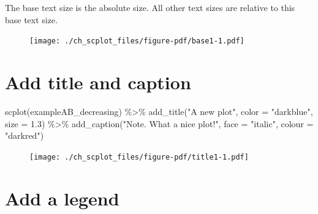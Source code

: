 \documentclass[
  letterpaper,
  DIV=11,
  numbers=noendperiod]{scrreprt}
\newenvironment{Shaded}{\begin{snugshade}}{\end{snugshade}}
\newcommand{\AttributeTok}[1]{\textcolor[rgb]{0.40,0.45,0.13}{#1}}
\newcommand{\DecValTok}[1]{\textcolor[rgb]{0.68,0.00,0.00}{#1}}
\newcommand{\FloatTok}[1]{\textcolor[rgb]{0.68,0.00,0.00}{#1}}
\newcommand{\FunctionTok}[1]{\textcolor[rgb]{0.28,0.35,0.67}{#1}}
\newcommand{\NormalTok}[1]{\textcolor[rgb]{0.00,0.23,0.31}{#1}}
\newcommand{\SpecialCharTok}[1]{\textcolor[rgb]{0.37,0.37,0.37}{#1}}
\newcommand{\StringTok}[1]{\textcolor[rgb]{0.13,0.47,0.30}{#1}}
\begin{document}
The base text size is the absolute size. All other text sizes are
relative to this base text size.

\begin{Shaded}
\end{Shaded}

\begin{figure}[H]

{\centering \texttt{[image: ./ch\_scplot\_files/figure-pdf/base1-1.pdf]}

}

\end{figure}

\hypertarget{add-title-and-caption}{%
\section{Add title and caption}\label{add-title-and-caption}}

\begin{Shaded}
\begin{Highlighting}[]
\FunctionTok{scplot}\NormalTok{(exampleAB\_decreasing) }\SpecialCharTok{\%\textgreater{}\%}
  \FunctionTok{add\_title}\NormalTok{(}\StringTok{"A new plot"}\NormalTok{, }\AttributeTok{color =} \StringTok{"darkblue"}\NormalTok{, }\AttributeTok{size =} \FloatTok{1.3}\NormalTok{) }\SpecialCharTok{\%\textgreater{}\%}
  \FunctionTok{add\_caption}\NormalTok{(}\StringTok{"Note. What a nice plot!"}\NormalTok{, }\AttributeTok{face =} \StringTok{"italic"}\NormalTok{, }\AttributeTok{colour =} \StringTok{"darkred"}\NormalTok{)}
\end{Highlighting}
\end{Shaded}

\begin{figure}[H]

{\centering \texttt{[image: ./ch\_scplot\_files/figure-pdf/title1-1.pdf]}

}

\end{figure}

\hypertarget{add-a-legend}{%
\section{Add a legend}\label{add-a-legend}}
\end{document}
